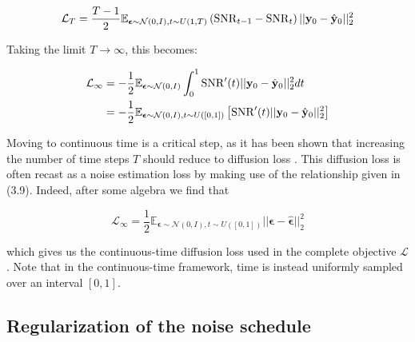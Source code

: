 
\begin{equation}
\mathcal{L}_{T} = \frac{T-1}{2} \mathbb{E}_{\boldsymbol{\epsilon}\sim \mathcal{N}(0,I),t\sim U(1,T)}\left(\mathrm{SNR}_{t-1}-\mathrm{SNR}_{t}\right)\lvert\lvert \bold{y}_{0} - \hat{\bold{y}}_{0} \lvert\lvert_{2}^{2}
\end{equation}

Taking the limit $T\rightarrow\infty$, this becomes:

\begin{align*}
\mathcal{L}_\infty &= -\frac{1}{2} \mathbb{E}_{\boldsymbol{\epsilon} \sim \mathcal{N}(0,I)} \int_{0}^{1} \mathrm{SNR}'(t) \lvert\lvert \bold{y}_{0} - \hat{\bold{y}}_{0} \lvert\lvert_{2}^{2} dt \\
&= -\frac{1}{2} \mathbb{E}_{\boldsymbol{\epsilon} \sim \mathcal{N}(0,I),t \sim U([0,1])} \left[\mathrm{SNR}'(t) \lvert\lvert \bold{y}_{0} - \hat{\bold{y}}_{0} \lvert\lvert_{2}^{2}\right]
\end{align*}

Moving to continuous time is a critical step, as it has been shown that increasing the number of time steps $T$ should reduce to diffusion loss \parencite{Kingma2023}. This diffusion loss is often recast as a noise estimation loss by making use of the relationship given in (3.9). Indeed, after some algebra we find that

\begin{equation*}
\mathcal{L}_\infty = \frac{1}{2} \mathbb{E}_{\boldsymbol{\epsilon} \sim \mathcal{N}(0,I),t \sim U([0,1])} \lvert\lvert \boldsymbol{\epsilon} - \hat{\boldsymbol{\epsilon}} \lvert\lvert_{2}^{2}
\end{equation*}

which gives us the continuous-time diffusion loss used in the complete objective $\mathcal{L}$. Note that in the continuous-time framework, time is instead uniformly sampled over an interval $[0,1]$. 

\subsection{Regularization of the noise schedule}

